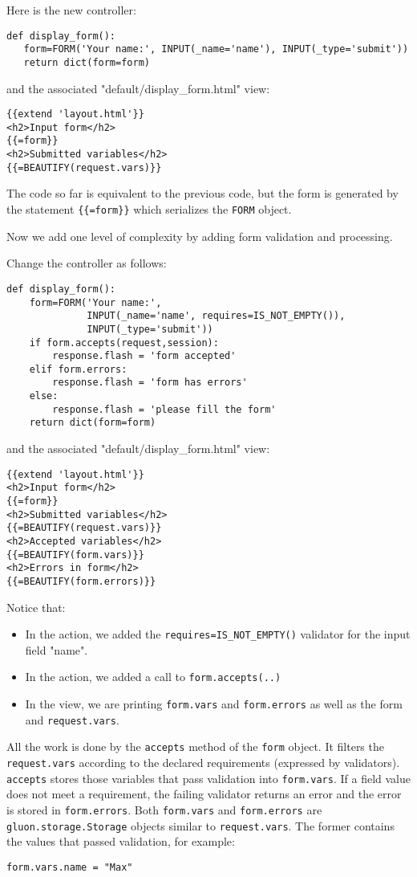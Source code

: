 \documentclass[justified,sixbynine,notoc]{tufte-book}
\def\ft{\small\tt}
\begin{document}
\begin{fullwidth}
Here is the new controller:
\begin{lstlisting}
def display_form():
   form=FORM('Your name:', INPUT(_name='name'), INPUT(_type='submit'))
   return dict(form=form)
\end{lstlisting}
\noindent and the associated "default/display\_form.html" view:
\begin{lstlisting}[keywords={}]
{{extend 'layout.html'}}
<h2>Input form</h2>
{{=form}}
<h2>Submitted variables</h2>
{{=BEAUTIFY(request.vars)}}
\end{lstlisting}

The code so far is equivalent to the previous code, but the form is generated by the statement {\ft \{\{=form\}\}} which serializes the {\ft FORM} object.

Now we add one level of complexity by adding form validation and processing.

Change the controller as follows:
\begin{lstlisting}
def display_form():
    form=FORM('Your name:',
              INPUT(_name='name', requires=IS_NOT_EMPTY()),
              INPUT(_type='submit'))
    if form.accepts(request,session):
        response.flash = 'form accepted'
    elif form.errors:
        response.flash = 'form has errors'
    else:
        response.flash = 'please fill the form'
    return dict(form=form)
\end{lstlisting}
\noindent and the associated "default/display\_form.html" view:
\begin{lstlisting}[keywords={}]
{{extend 'layout.html'}}
<h2>Input form</h2>
{{=form}}
<h2>Submitted variables</h2>
{{=BEAUTIFY(request.vars)}}
<h2>Accepted variables</h2>
{{=BEAUTIFY(form.vars)}}
<h2>Errors in form</h2>
{{=BEAUTIFY(form.errors)}}
\end{lstlisting}

Notice that:
\begin{itemize}
\item In the action, we added the {\ft requires=IS\_NOT\_EMPTY()} validator for the input field "name".

\item In the action, we added a call to {\ft form.accepts(..)}

\item In the view, we are printing {\ft form.vars} and {\ft form.errors} as well as the form and {\ft request.vars}.
\end{itemize}

All the work is done by the {\ft accepts} method of the {\ft form} object. It filters the {\ft request.vars} according to the declared requirements (expressed by validators). {\ft accepts} stores those variables that pass validation into {\ft form.vars}. If a field value does not meet a requirement, the failing validator returns an error and the error is stored in {\ft form.errors}. Both {\ft form.vars} and {\ft form.errors} are {\ft gluon.storage.Storage} objects similar to {\ft request.vars}. The former contains the values that passed validation, for example:
\begin{lstlisting}
form.vars.name = "Max"
\end{lstlisting}


\end{fullwidth}
\end{document}
